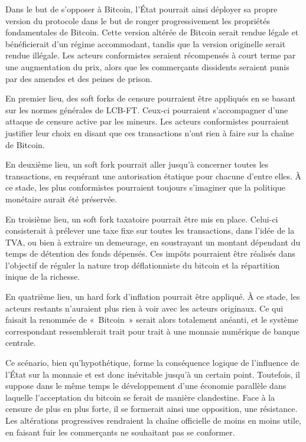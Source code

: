 Dans le but de s'opposer à Bitcoin, l'État pourrait ainsi déployer sa propre version du protocole dans le but de ronger progressivement les propriétés fondamentales de Bitcoin. Cette version altérée de Bitcoin serait rendue légale et bénéficierait d'un régime accommodant, tandis que la version originelle serait rendue illégale. Les acteurs conformistes seraient récompensés à court terme par une augmentation du prix, alors que les commerçants dissidents seraient punis par des amendes et des peines de prison.

En premier lieu, des soft forks de censure pourraient être appliqués en se basant sur les normes générales de LCB-FT. Ceux-ci pourraient s'accompagner d'une attaque de censure active par les mineurs. Les acteurs conformistes pourraient justifier leur choix en disant que ces transactions n'ont rien à faire sur la chaîne de Bitcoin.

En deuxième lieu, un soft fork pourrait aller jusqu'à concerner toutes les transactions, en requérant une autorisation étatique pour chacune d'entre elles. À ce stade, les plus conformistes pourraient toujours s'imaginer que la politique monétaire aurait été préservée.

En troisième lieu, un soft fork taxatoire pourrait être mis en place. Celui-ci consisterait à prélever une taxe fixe sur toutes les transactions, dans l'idée de la TVA, ou bien à extraire un demeurage, en soustrayant un montant dépendant du temps de détention des fonds dépensés. Ces impôts pourraient être réalisés dans l'objectif de réguler la nature trop déflationniste du bitcoin et la répartition inique de la richesse.

En quatrième lieu, un hard fork d'inflation pourrait être appliqué. À ce stade, les acteurs restants n'auraient plus rien à voir avec les acteurs originaux. Ce qui faisait la renommée de «~Bitcoin~» serait alors totalement anéanti, et le système correspondant ressemblerait trait pour trait à une monnaie numérique de banque centrale.

Ce scénario, bien qu'hypothétique, forme la conséquence logique de l'influence de l'État sur la monnaie et est donc inévitable jusqu'à un certain point. Toutefois, il suppose dans le même temps le développement d'une économie parallèle dans laquelle l'acceptation du bitcoin se ferait de manière clandestine. Face à la censure de plus en plus forte, il se formerait ainsi une opposition, une résistance. Les altérations progressives rendraient la chaîne officielle de moins en moins utile, en faisant fuir les commerçants ne souhaitant pas se conformer.

